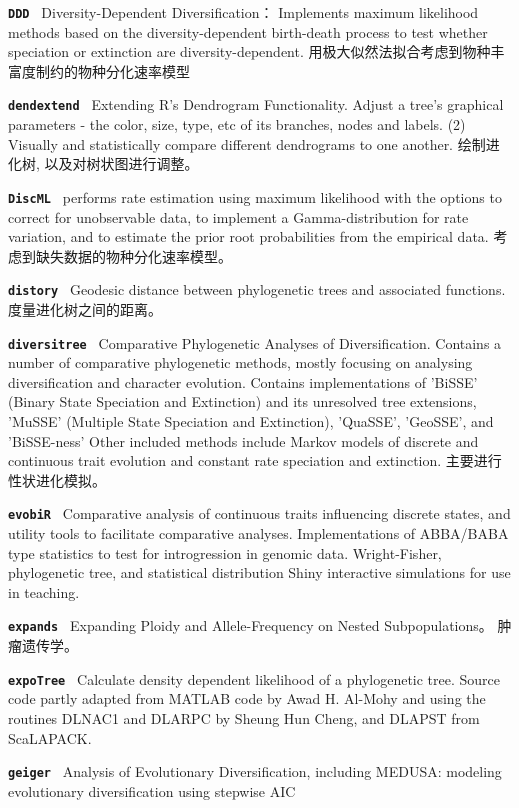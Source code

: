 \documentclass[10pt,landscape]{article}
\newcommand{\bcode}[1]{\texttt{\textbf{#1}}}
\begin{document}
\begin{CJK}{UTF8}{gbsn}
\begin{multicols}{3}
\bcode{DDD            } Diversity-Dependent Diversification： Implements maximum likelihood methods based on the diversity-dependent birth-death process to test whether speciation or extinction are diversity-dependent. 用极大似然法拟合考虑到物种丰富度制约的物种分化速率模型

\bcode{dendextend     } Extending R's Dendrogram Functionality. Adjust a tree's graphical parameters - the color, size, type, etc of its branches, nodes and labels. (2) Visually and statistically compare different dendrograms to one another. 绘制进化树, 以及对树状图进行调整。 

\bcode{DiscML         } performs rate estimation using maximum likelihood with the options to correct for unobservable data, to implement a Gamma-distribution for rate variation, and to estimate the prior root probabilities from the empirical data. 考虑到缺失数据的物种分化速率模型。 

\bcode{distory        } Geodesic distance between phylogenetic trees and associated functions. 度量进化树之间的距离。

\bcode{diversitree    } Comparative Phylogenetic Analyses of Diversification. Contains a number of comparative phylogenetic methods, mostly focusing on analysing diversification and character evolution. Contains implementations of 'BiSSE' (Binary State Speciation and Extinction) and its unresolved tree extensions, 'MuSSE' (Multiple State Speciation and Extinction), 'QuaSSE', 'GeoSSE', and 'BiSSE-ness' Other included methods include Markov models of discrete and continuous trait evolution and constant rate speciation and extinction. 主要进行性状进化模拟。

\bcode{evobiR         } Comparative analysis of continuous traits influencing discrete states, and utility tools to facilitate comparative analyses. Implementations of ABBA/BABA type statistics to test for introgression in genomic data. Wright-Fisher, phylogenetic tree, and statistical distribution Shiny interactive simulations for use in teaching.

\bcode{expands        } Expanding Ploidy and Allele-Frequency on Nested Subpopulations。 肿瘤遗传学。 

\bcode{expoTree       } Calculate density dependent likelihood of a phylogenetic tree. Source code partly adapted from MATLAB code by Awad H. Al-Mohy and using the routines DLNAC1 and DLARPC by Sheung Hun Cheng, and DLAPST from ScaLAPACK.

\bcode{geiger         } Analysis of Evolutionary Diversification, including MEDUSA: modeling evolutionary diversification using stepwise AIC


\end{multicols}
\end{CJK}
\end{document}
